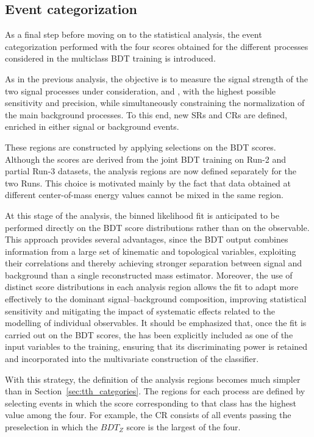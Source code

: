 \subsection{Event categorization}
\label{new_categorization}

As a final step before moving on to the statistical analysis, the event categorization performed with the four scores obtained for the different processes considered in the multiclass BDT training is introduced.

As in the previous analysis, the objective is to measure the signal strength of the two signal processes under consideration, \thtt and \ttHtt, with the highest possible sensitivity and precision, while simultaneously constraining the normalization of the main background processes. To this end, new SRs and CRs are defined, enriched in either signal or background events.

These regions are constructed by applying selections on the BDT scores. Although the scores are derived from the joint BDT training on Run-2 and partial Run-3 datasets, the analysis regions are now defined separately for the two Runs. This choice is motivated mainly by the fact that data obtained at different center-of-mass energy values cannot be mixed in the same region.

At this stage of the analysis, the binned likelihood fit is anticipated to be performed directly on the BDT score distributions rather than on the \mmc observable. This approach provides several advantages, since the BDT output combines information from a large set of kinematic and topological variables, exploiting their correlations and thereby achieving stronger separation between signal and background than a single reconstructed mass estimator. Moreover, the use of distinct score distributions in each analysis region allows the fit to adapt more effectively to the dominant signal–background composition, improving statistical sensitivity and mitigating the impact of systematic effects related to the modelling of individual observables. It should be emphasized that, once the fit is carried out on the BDT scores, the \mmc has been explicitly included as one of the input variables to the training, ensuring that its discriminating power is retained and incorporated into the multivariate construction of the classifier.

With this strategy, the definition of the analysis regions becomes much simpler than in Section~\ref{sec:tth_categories}. The regions for each process are defined by selecting events in which the score corresponding to that class has the highest value among the four. For example, the \ztautau CR consists of all events passing the preselection in which the $BDT_{Z}$ score is the largest of the four.

